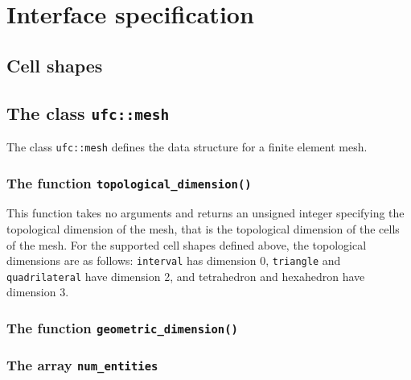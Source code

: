 \chapter{Interface specification}



\section{Cell shapes}


\section{The class \texttt{ufc::mesh}}

The class \texttt{ufc::mesh} defines the data structure for a finite element mesh.



\subsection{The function \texttt{topological\_dimension()}}

This function takes no arguments and returns an unsigned integer
specifying the topological dimension of the mesh, that is the
topological dimension of the cells of the mesh. For the supported
cell shapes defined above, the topological dimensions are as follows:
\texttt{interval} has dimension 0, \texttt{triangle} and
\texttt{quadrilateral} have dimension 2, and tetrahedron and
hexahedron have dimension 3.

\subsection{The function \texttt{geometric\_dimension()}}


\subsection{The array \texttt{num\_entities}}

